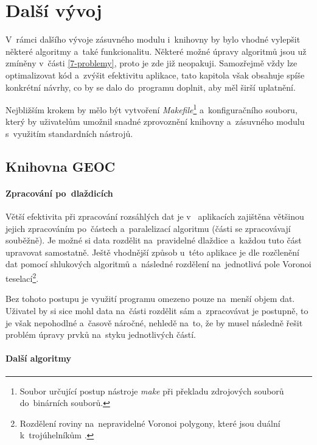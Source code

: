 \chapter{Další vývoj}
\label{8-vyvoj}

V~rámci dalšího vývoje zásuvného modulu i~knihovny 
by bylo vhodné vylepšit některé algoritmy a~také funkcionalitu.
Některé možné úpravy algoritmů jsou už zmíněny v~části 
\ref{7-problemy}, proto je zde již neopakuji. 
Samozřejmě vždy lze optimalizovat kód a~zvýšit efektivitu aplikace,
tato kapitola však obsahuje spíše konkrétní návrhy, co by se dalo 
do~programu doplnit, aby měl širší uplatnění.

Nejbližším krokem by mělo být vytvoření \textit{Makefile}\footnote{Soubor 
určující postup nástroje \textit{make} při překladu zdrojových
souborů do~binárních souborů.} a~konfiguračního souboru, který by 
uživatelům umožnil snadné zprovoznění knihovny a~zásuvného modulu
s~využitím standardních nástrojů.

\section{Knihovna GEOC}
\label{geoc-vyvoj}

\subsubsection{Zpracování po~dlaždicích}
\label{dlazdice-vyvoj}

Větší efektivita při zpracování rozsáhlých dat je v~ 
aplikacích zajištěna většinou jejich zpracováním po~částech 
a~paralelizací algoritmu (části se zpracovávají souběžně). Je možné
si data rozdělit na~pravidelné dlaždice a~každou tuto část upravovat
samostatně. Ještě vhodnější způsob u~této aplikace je dle \cite{freitas}
rozčlenění dat pomocí shlukových algoritmů a~následné rozdělení
na~jednotlivá pole Voronoi teselací\footnote{Rozdělení roviny 
na~nepravidelné Voronoi polygony, které jsou duální k~trojúhelníkům
.}.

Bez tohoto postupu je využití programu omezeno pouze na~menší objem
dat. Uživatel by si sice mohl data na~části rozdělit sám a~zpracovávat
je postupně, to je však nepohodlné a~časově náročné, nehledě na~to,
že by musel následně řešit problém úpravy prvků na~styku jednotlivých 
částí.


\subsubsection{Další algoritmy}
\label{dalsi-vyvoj}


